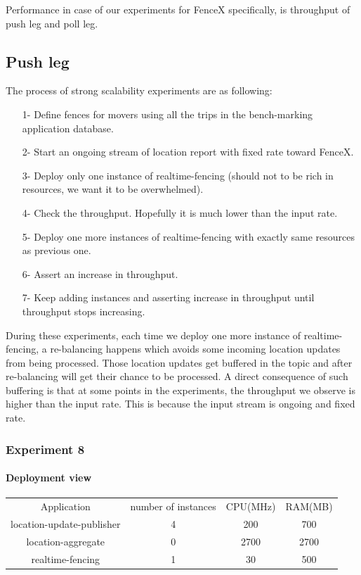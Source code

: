 \documentclass[a4]{report}
\begin{document}
    Performance in case of our experiments for FenceX specifically, is  throughput of push leg and poll leg.

    \subsection{Push leg}
    The process of strong scalability experiments are as following:
    \begin{itemize}
        \item[1-] Define fences for movers using all the trips in the bench-marking application database.
        \item[2-] Start an ongoing stream of location report with fixed rate toward FenceX.
        \item[3-] Deploy only one instance of realtime-fencing (should not to be rich in resources, we want it to
        be overwhelmed).
        \item[4-] Check the throughput. Hopefully it is much lower than the input rate.
        \item[5-] Deploy one more instances of realtime-fencing with exactly same resources as previous one.
        \item[6-] Assert an increase in throughput.
        \item[7-] Keep adding instances and asserting increase in throughput until throughput stops increasing.
    \end{itemize}

    During these experiments, each time we deploy one more instance of realtime-fencing, a re-balancing happens which
    avoids some incoming location updates from being processed.
    Those location updates get buffered in the topic and after re-balancing will get their chance to be processed.
    A direct consequence of such buffering is that at some points in the experiments, the throughput we observe is
    higher than the input rate.
    This is because the input stream is ongoing and fixed rate.

    \subsubsection{Experiment 8}
    \paragraph{Deployment view}
    \begin{center}
        \begin{tabular}{ c c c c }
            Application               &  number of instances     & CPU(MHz)  & RAM(MB)    \\
            location-update-publisher &          4               & 200       &   700      \\
            location-aggregate        &          0               & 2700      &   2700     \\
            realtime-fencing          &          1               & 30       &   500       \\
        \end{tabular}
    \end{center}
\end{document}
